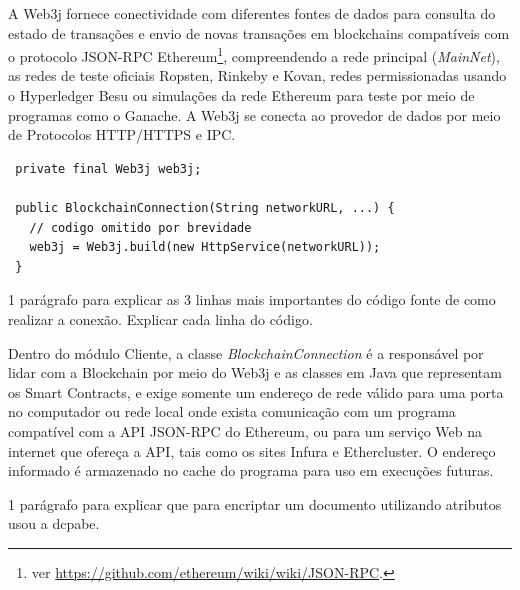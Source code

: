 \documentclass[a4paper,11pt]{article}
\begin{document}
A Web3j fornece conectividade com diferentes fontes de dados para consulta do estado de transações e envio de novas transações em blockchains compatíveis com o protocolo JSON-RPC Ethereum\footnote{ver \href{https://github.com/ethereum/wiki/wiki/JSON-RPC}{https://github.com/ethereum/wiki/wiki/JSON-RPC}.}, compreendendo a rede principal (\emph{MainNet}), as redes de teste oficiais Ropsten, Rinkeby e Kovan, redes permissionadas usando o Hyperledger Besu ou simulações da rede Ethereum para teste por meio de programas como o Ganache.
A Web3j se conecta ao provedor de dados por meio de Protocolos HTTP/HTTPS e IPC.


\begin{lstlisting}
 private final Web3j web3j;

 public BlockchainConnection(String networkURL, ...) {
   // codigo omitido por brevidade
   web3j = Web3j.build(new HttpService(networkURL));
 }
\end{lstlisting}

{\color{Magenta} 1 parágrafo para explicar as 3 linhas mais importantes do código fonte de como realizar a conexão. Explicar cada linha do código. }

Dentro do módulo Cliente, a classe \emph{BlockchainConnection} é a responsável por lidar com a Blockchain por meio do Web3j e as classes em Java que representam os Smart Contracts, e exige somente um endereço de rede válido para uma porta no computador ou rede local onde exista comunicação com um programa compatível com a API JSON-RPC do Ethereum, ou para um serviço Web na internet que ofereça a API, tais como os sites Infura e Ethercluster.
O endereço informado é armazenado no cache do programa para uso em execuções futuras.

{\color{Magenta} 1 parágrafo para explicar que para encriptar um documento utilizando atributos usou a dcpabe.}
\end{document}
